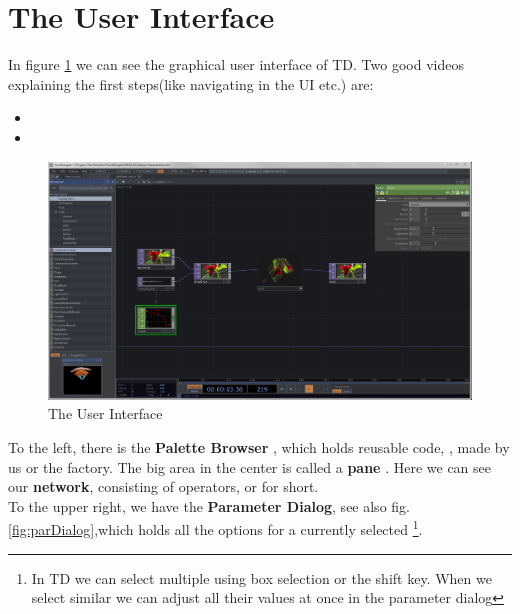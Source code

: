 \section{The User Interface} %
\label{sub:the_user_interface}

In figure \ref{fig:ui} we can see the graphical user interface of TD. Two good videos explaining the first steps(like navigating in the UI etc.) are:
\begin{itemize}
	\item {}
	\item {}
\end{itemize}

\begin{figure}[H]
	\begin{center}
		\includegraphics[width = 14cm]{img/gui.png}
		\caption{The User Interface}
		\label{fig:ui}
	\end{center}
\end{figure}

To the left, there is the \textbf{Palette Browser} , which holds reusable code, \COMPs, made by us or the factory. The big area in the center is called a \textbf{pane} . Here we can see our \textbf{network}, consisting of operators, or \OPs for short.\\
To the upper right, we have the \textbf{Parameter Dialog}, see also fig. \ref{fig:parDialog},which holds all the options for a currently selected \OP\footnote{In TD we can select multiple \OPs using box selection or the shift key. When we select similar \OPs we can adjust all their values at once in the parameter dialog }.\\

